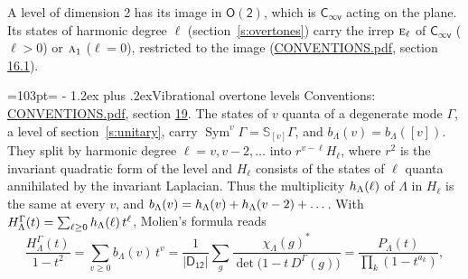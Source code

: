 \documentclass[10pt,a4paper]{article}
\makeatletter
\renewcommand\section{\@startsection{section}{1}{\z@}{-3ex plus -1ex minus -.2ex}%
  {1.2ex plus .2ex}{\normalfont\large\sffamily\bfseries\color{parttitle}}}
\newcommand{\needspace}[1]{\par\penalty-100\begingroup\dimen0=#1\relax\dimen2=\pagegoal
  \advance\dimen2-\pagetotal\ifdim\dimen0>\dimen2\relax\ifdim\dimen2>0pt\vfil\break\fi\fi
  \endgroup}
\numberwithin{equation}{section}
\newcommand{\grp}[1]{\mathsf{#1}}
\newcommand{\irr}[1]{\text{\normalfont\scshape #1}}
\newcommand{\repD}[1]{D^{#1}}
\newcommand{\irchar}[1]{\chi_{#1}}
\newcommand{\conj}[1]{{#1}^{*}}
\newcommand{\schur}[1]{\mathbb{S}_{#1}}
\newcommand{\shape}[1]{[#1]}
\makeatother
\begin{document}
A level of dimension 2 has its image in $\grp{O(2)}$, which is \href{Cinfv.pdf}{$\grp{C_{\infty v}}$} acting on the plane. \label{n:index.harmonic.degree}Its states of harmonic degree $\ell$ (section~\ref{s:overtones}) carry the irrep $\irr{e}_{\ell}$ of \href{Cinfv.pdf}{$\grp{C_{\infty v}}$} ($\ell > 0$) or $\irr{a}_{1}$ ($\ell = 0$), restricted to the image (\href{../../CONVENTIONS.pdf}{CONVENTIONS.pdf}, section \href{../../CONVENTIONS.pdf\#conv.16.1}{16.1}).
\needspace{103pt}
\section{Vibrational overtone levels}\label{s:overtones}
Conventions: \href{../../CONVENTIONS.pdf}{CONVENTIONS.pdf}, section \href{../../CONVENTIONS.pdf\#conv.19}{19}.
\leavevmode\label{n:index.quanta}\label{n:operator.symmetric.power}The states of $v$ quanta of a degenerate mode $\Gamma$, a level of section~\ref{s:unitary}, carry $\operatorname{Sym}^{v}\Gamma = \schur{\shape{v}}\Gamma$, and $b_\Lambda(v) = b_\Lambda(\shape{v})$. \label{n:local.quadratic.form}\label{n:set.harmonic}They split by harmonic degree $\ell = v, v - 2, \dots$ into $r^{v-\ell}H_\ell$, where $r^2$ is the invariant quadratic form of the level and $H_\ell$ consists of the states of $\ell$ quanta annihilated by the invariant Laplacian. \label{n:function.multiplicity.harmonic}Thus the multiplicity $\mathnormal{h}_\Lambda(\ell)$ of $\Lambda$ in $H_\ell$ is the same at every $v$, and $b_\Lambda(v) = \mathnormal{h}_\Lambda(v) + \mathnormal{h}_\Lambda(v - 2) + \dots$. \label{n:function.generating.level}With $H^{\Gamma}_\Lambda(t) = \sum_{\ell\ge0} \mathnormal{h}_\Lambda(\ell)\,t^{\ell}$, Molien's formula reads
\begin{equation}\label{e:molien}\frac{H^{\Gamma}_\Lambda(t)}{1 - t^2} = \sum_{v\ge0} b_\Lambda(v)\,t^v = \frac{1}{|\grp{D_{12}}|}\sum_{g}\frac{\conj{\irchar{\Lambda}(g)}}{\det\bigl(1 - t\,\repD{\Gamma}(g)\bigr)} = \frac{P_\Lambda(t)}{\prod_k (1-t^{a_k})},\end{equation}
\end{document}
